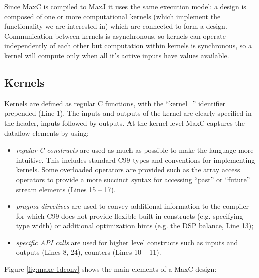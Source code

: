 Since MaxC is compiled to MaxJ it uses the same execution model: a
design is composed of one or more computational kernels (which
implement the functionality we are interested in) which are connected
to form a design. Communication between kernels is asynchronous, so
kernels can operate independently of each other but computation within
kernels is synchronous, so a kernel will compute only when all it's
active inputs have values available.

\subsection{Kernels}

Kernels are defined as regular C functions, with the ``kernel\_''
identifier prepended (Line 1). The inputs and outputs of the kernel
are clearly specified in the header, inputs followed by outputs. At
the kernel level MaxC captures the dataflow elements by using:

\begin{itemize}
\item \emph{regular C constructs} are used as much as possible to make
  the language more intuitive. This includes standard C99 types and
  conventions for implementing kernels. Some overloaded operators are
  provided such as the array access operators to provide a more
  succinct syntax for accessing ``past'' or ``future'' stream elements
  (Lines 15 -- 17).

\item \emph{pragma directives} are used to convey additional
  information to the compiler for which C99 does not provide flexible
  built-in constructs (e.g. specifying type width) or additional
  optimization hints (e.g. the DSP balance, Line 13);

\item \emph{specific API calls} are used for higher level constructs
  such as inputs and outputs (Lines 8, 24), counters (Lines 10 -- 11).

\end{itemize}


Figure \ref{fig:maxc-1dconv} shows the main elements of a MaxC design:

